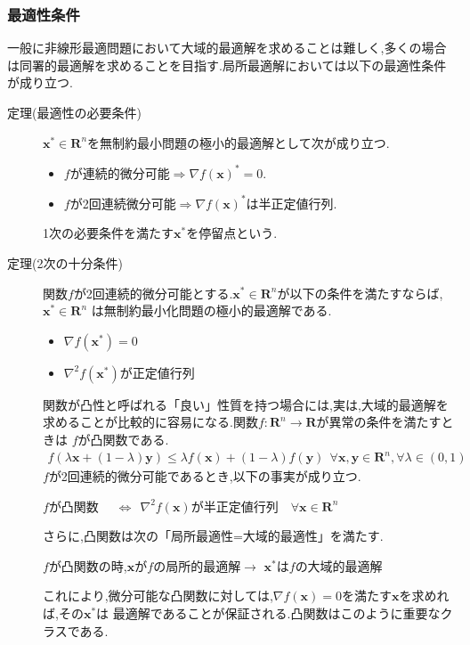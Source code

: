 \documentclass[12pt]{jarticle}
\begin{document}
\subsubsection{最適性条件}
一般に非線形最適問題において大域的最適解を求めることは難しく,多くの場合は同署的最適解を求めることを目指す.局所最適解においては以下の最適性条件が成り立つ.
\begin{description}
    \item[定理(最適性の必要条件)] $\boldsymbol{x}^*\in \boldsymbol{R}^n$を無制約最小問題の極小的最適解として次が成り立つ.
    \begin{itemize}
        \item $f$が連続的微分可能$\Rightarrow \nabla f(\boldsymbol{x})^*=0$.
        \item $f$が2回連続微分可能$\Rightarrow \nabla f(\boldsymbol{x})^*$は半正定値行列.
    \end{itemize}
    1次の必要条件を満たす$\boldsymbol{x}^*$を停留点という.
    \item[定理(2次の十分条件)] 関数$f$が2回連続的微分可能とする.$\boldsymbol{x}^*\in \boldsymbol{R}^n$が以下の条件を満たすならば,$\boldsymbol{x}^*\in \boldsymbol{R}^n$
    は無制約最小化問題の極小的最適解である.
    \begin{itemize}
        \item $\nabla f(\boldsymbol{x}^*)=0$
        \item $\nabla^2f(\boldsymbol{x}^*)$が正定値行列
    \end{itemize}
    関数が凸性と呼ばれる「良い」性質を持つ場合には,実は,大域的最適解を求めることが比較的に容易になる.関数$f:\boldsymbol{R}^n\rightarrow \boldsymbol{R}$が異常の条件を満たすときは
    $f$が凸関数である.
    \begin{eqnarray}
        f(\lambda\boldsymbol{x}+(1-\lambda)\boldsymbol{y})\leq \lambda f(\boldsymbol{x})+(1-\lambda)f(\boldsymbol{y})\ \ \forall \boldsymbol{x},\boldsymbol{y}\in \boldsymbol{R}^n,\forall \lambda\in(0,1)\nonumber
    \end{eqnarray}
    $f$が2回連続的微分可能であるとき,以下の事実が成り立つ.
    \begin{center}
        $f$が凸関数 \ \ $\Leftrightarrow\ \ \nabla^2f(\boldsymbol{x})$が半正定値行列\ \ $\forall \boldsymbol{x}\in \boldsymbol{R}^n$ 
    \end{center}
    さらに,凸関数は次の「局所最適性=大域的最適性」を満たす.
    \begin{center}
        $f$が凸関数の時,$\boldsymbol{x}$が$f$の局所的最適解$\rightarrow$ $\boldsymbol{x}^*$は$f$の大域的最適解
    \end{center}
    これにより,微分可能な凸関数に対しては,$\nabla f(\boldsymbol{x})=0$を満たす$\boldsymbol{x}$を求めれば,その$\boldsymbol{x}^*$は
    最適解であることが保証される.凸関数はこのように重要なクラスである.
\end{description}
\end{document}

